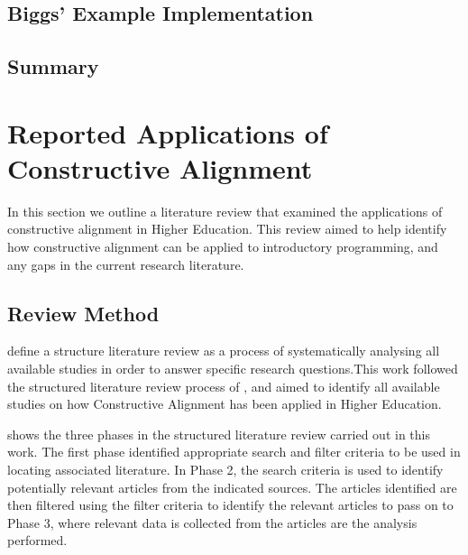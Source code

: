 
\subsection{Biggs' Example Implementation} %
\label{sub:biggs_example_implementation}

\citet{Biggs:2007}

\citet{Biggs:1996c} \citet{Biggs:1997}


\subsection{Summary} %
\label{sub:ca_summary}




\clearpage
\section{Reported Applications of Constructive Alignment} %
\label{sec:reported_applications_of_constructive_alignment}

In this section we outline a literature review that examined the applications of constructive alignment in Higher Education. This review aimed to help identify how constructive alignment can be applied to introductory programming, and any gaps in the current research literature. 

\subsection{Review Method} %
\label{sub:review_method}

\citet{Petticrew:2008} define a structure literature review as a process of systematically analysing all available studies in order to answer specific research questions.This work followed the structured literature review process of \citet{Kitchenham:2004}, and aimed to identify all available studies on how Constructive Alignment has been applied in Higher Education.

 shows the three phases in the structured literature review carried out in this work. The first phase identified appropriate search and filter criteria to be used in locating associated literature. In Phase 2, the search criteria is used to identify potentially relevant articles from the indicated sources. The articles identified are then filtered using the filter criteria to identify the relevant articles to pass on to Phase 3, where relevant data is collected from the articles are the analysis performed.

